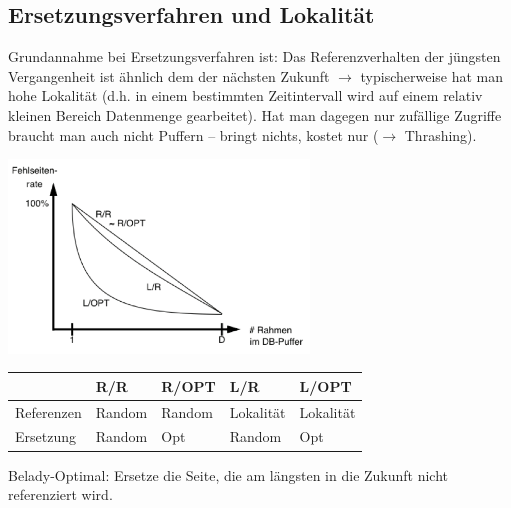 \subsection*{Ersetzungsverfahren und Lokalität}
\begin{minipage}{0.45\textwidth}
	Grundannahme bei Ersetzungsverfahren ist: Das Referenzverhalten der jüngsten Vergangenheit ist ähnlich dem der nächsten Zukunft $\rightarrow$ typischerweise hat man hohe Lokalität (d.h. in einem bestimmten Zeitintervall wird auf einem relativ kleinen Bereich Datenmenge gearbeitet). Hat man dagegen nur zufällige Zugriffe braucht man auch nicht Puffern -- bringt nichts, kostet nur ($\rightarrow$ Thrashing).
\end{minipage}
\begin{minipage}{0.5\textwidth}
	\includegraphics[width = 8cm]{Pictures/Ue07_Aufgabe2_Zusatz1.png}
\end{minipage}

\begin{tabular}{|l|l|l|l|l|}
	\hline
	 					& R/R 			& R/OPT 		& L/R 			& L/OPT 		\\
	\hline
	Referenzen 	& Random 	& Random 	& Lokalität 	& Lokalität 	\\
	\hline
	Ersetzung 	& Random 	& Opt 			& Random 	& Opt 			\\
	\hline
\end{tabular}

Belady-Optimal: Ersetze die Seite, die am längsten in die Zukunft nicht referenziert wird.
